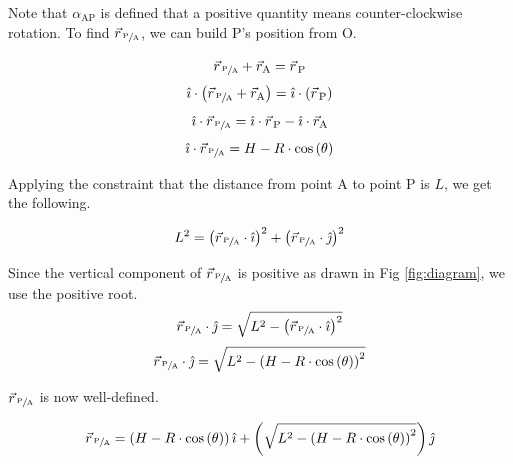 \documentclass[nofoot,pdf-a,balance,colorlinks,upint,subscriptcorrection,varvw,mathalfa=cal=boondoxo]{asmeconf}
\begin{document}
    Note that $\alpha_{\textrm{AP}}$ is defined that a positive quantity means counter-clockwise rotation. To find $\vec{r}_{\,\sfrac{\textrm{P}}{\textrm{A}}}$, we can build P's position from O.

    \begin{equation}
        \vec{r}_{\,\sfrac{\textrm{P}}{\textrm{A}}} + \vec{r}_{\textrm{A}} = \vec{r}_{\,\textrm{P}}
    \end{equation}
    \begin{equation}
        \hat{\imath}\cdot \left(\vec{r}_{\,\sfrac{\textrm{P}}{\textrm{A}}} + \vec{r}_{\textrm{A}}\right) = \hat{\imath} \cdot \left(\vec{r}_{\,\textrm{P}}\right)
    \end{equation}
    \begin{equation}
        \hat{\imath}\cdot \vec{r}_{\,\sfrac{\textrm{P}}{\textrm{A}}} = \hat{\imath} \cdot \vec{r}_{\,\textrm{P}} - \hat{\imath} \cdot\vec{r}_{\textrm{A}} 
    \end{equation}
    \begin{equation}
        \hat{\imath}\cdot \vec{r}_{\,\sfrac{\textrm{P}}{\textrm{A}}} = H - R\cdot\cos{\left(\theta\right)}
    \end{equation}

    Applying the constraint that the distance from point A to point P is $L$, we get the following.

    \begin{equation} 
        L^2 = \left(\vec{r}_{\,\sfrac{\textrm{P}}{\textrm{A}}} \cdot\hat{\imath} \right)^2+ \left(\vec{r}_{\,\sfrac{\textrm{P}}{\textrm{A}}} \cdot\hat{\jmath}\right)^2
    \end{equation}

    Since the vertical component of $\vec{r}_{\,\sfrac{\textrm{P}}{\textrm{A}}}$ is positive as drawn in Fig \ref{fig:diagram}, we use the positive root.
    \begin{equation} 
        \vec{r}_{\,\sfrac{\textrm{P}}{\textrm{A}}} \cdot\hat{\jmath} = \sqrt{L^2 - \left(\vec{r}_{\,\sfrac{\textrm{P}}{\textrm{A}}} \cdot\hat{\imath} \right)^2}
    \end{equation}
    \begin{equation} 
        \vec{r}_{\,\sfrac{\textrm{P}}{\textrm{A}}} \cdot\hat{\jmath} = \sqrt{L^2 - \left(H - R\cdot\cos{\left(\theta\right)}\right)^2}
    \end{equation}

    $\vec{r}_{\,\sfrac{\textrm{P}}{\textrm{A}}}$ is now well-defined.

    \begin{equation} 
        \vec{r}_{\,\sfrac{\textrm{P}}{\textrm{A}}} = \left(H - R\cdot\cos{\left(\theta\right)}\right)\hat{\imath} + \left(\sqrt{L^2 - \left(H - R\cdot\cos{\left(\theta\right)}\right)^2}\right)\hat{\jmath}
    \end{equation}
\end{document}
